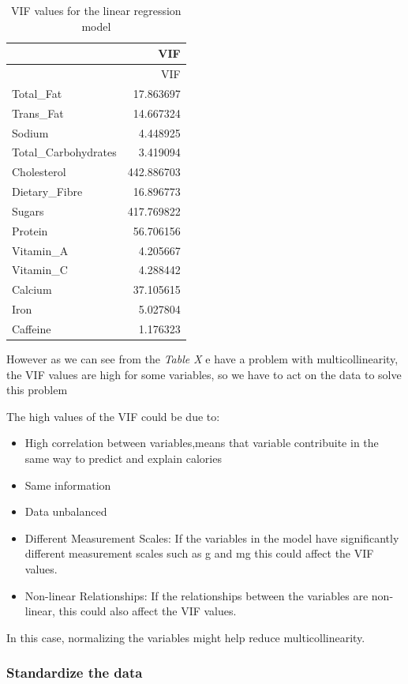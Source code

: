 \documentclass[
]{article}
\begin{document}
\begin{longtable}[]{@{}lr@{}}
\caption{VIF values for the linear regression model}\tabularnewline
\toprule\noalign{}
& VIF \\
\midrule\noalign{}
\endfirsthead
\toprule\noalign{}
& VIF \\
\midrule\noalign{}
\endhead
\bottomrule\noalign{}
\endlastfoot
Total\_Fat & 17.863697 \\
Trans\_Fat & 14.667324 \\
Sodium & 4.448925 \\
Total\_Carbohydrates & 3.419094 \\
Cholesterol & 442.886703 \\
Dietary\_Fibre & 16.896773 \\
Sugars & 417.769822 \\
Protein & 56.706156 \\
Vitamin\_A & 4.205667 \\
Vitamin\_C & 4.288442 \\
Calcium & 37.105615 \\
Iron & 5.027804 \\
Caffeine & 1.176323 \\
\end{longtable}

However as we can see from the \emph{Table X} e have a problem with
multicollinearity, the VIF values are high for some variables, so we
have to act on the data to solve this problem

The high values of the VIF could be due to:

\begin{itemize}
\item
  High correlation between variables,means that variable contribuite in
  the same way to predict and explain calories
\item
  Same information
\item
  Data unbalanced
\item
  Different Measurement Scales: If the variables in the model have
  significantly different measurement scales such as g and mg this could
  affect the VIF values.
\item
  Non-linear Relationships: If the relationships between the variables
  are non-linear, this could also affect the VIF values.
\end{itemize}

In this case, normalizing the variables might help reduce
multicollinearity.

\subsubsection{Standardize the data}\label{standardize-the-data}
\end{document}

